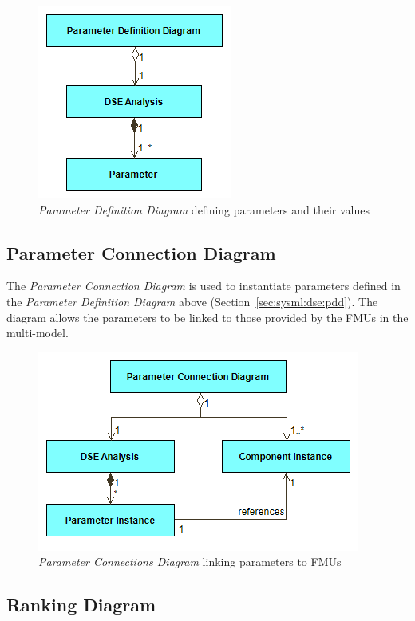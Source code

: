 \begin{figure}[h!]
\centering
\includegraphics[scale=0.5]{figures/DSE/ParameterDefinitionView}
\caption{\emph{Parameter Definition Diagram} defining parameters and their values}
\label{fig:sysml:sysml:dse:pdd}
\end{figure}

\subsection{Parameter Connection Diagram}
\label{sec:sysml:dse:pcd}

The \emph{Parameter Connection Diagram} is used to instantiate parameters defined in the \emph{Parameter Definition Diagram} above (Section~\ref{sec:sysml:dse:pdd}). The diagram allows the parameters to be linked to those provided by the FMUs in the multi-model.

\begin{figure}[h!]
\centering
\includegraphics[scale=0.5]{figures/DSE/ParameterConnectionsView}
\caption{\emph{Parameter Connections Diagram} linking parameters to FMUs}
\label{fig:sysml:sysml:dse:pcd}
\end{figure}

\subsection{Ranking Diagram}
\label{sec:sysml:dse:rd}

